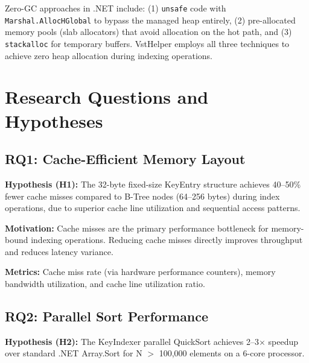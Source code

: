 \documentclass[conference]{IEEEtran}
\begin{document}
Zero-GC approaches in .NET include: (1) \texttt{unsafe} code with \texttt{Marshal.AllocHGlobal} to bypass the managed heap entirely, (2) pre-allocated memory pools (slab allocators) that avoid allocation on the hot path, and (3) \texttt{stackalloc} for temporary buffers. VstHelper employs all three techniques to achieve zero heap allocation during indexing operations.

\section{Research Questions and Hypotheses}
\label{sec:rq}

\subsection{RQ1: Cache-Efficient Memory Layout}
\label{sec:rq1}

\textbf{Hypothesis (H1):} The 32-byte fixed-size KeyEntry structure achieves 40--50\% fewer cache misses compared to B-Tree nodes (64--256 bytes) during index operations, due to superior cache line utilization and sequential access patterns.

\textbf{Motivation:} Cache misses are the primary performance bottleneck for memory-bound indexing operations. Reducing cache misses directly improves throughput and reduces latency variance.

\textbf{Metrics:} Cache miss rate (via hardware performance counters), memory bandwidth utilization, and cache line utilization ratio.

\subsection{RQ2: Parallel Sort Performance}
\label{sec:rq2}

\textbf{Hypothesis (H2):} The KeyIndexer parallel QuickSort achieves 2--3$\times$ speedup over standard .NET Array.Sort for N $>$ 100,000 elements on a 6-core processor.
\end{document}
